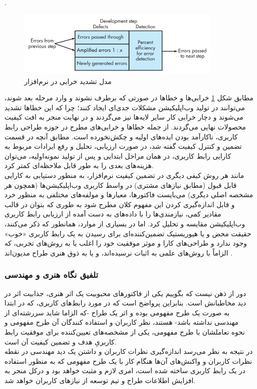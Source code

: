 \documentclass{article}
\theoremstyle{definition}
\begin{document}
\cite{sommerville}.
\begin{figure}[H]
	\centering\includegraphics[width=10cm]{Resources/defect.PNG}
	\caption{مدل تشدید خرابی در نرم‌افزار
		\cite{pressman}
	}
	\label{defect}
\end{figure}
مطابق شکل
\ref{defect}
خرابی‌ها و خطاها در صورتی که برطرف نشوند و وارد مرحله بعد شوند، می‌توانند در تولید وب‌اپلیکیشن مشکلات جدی‌ای ایجاد کنند؛ چرا که این خطاها تشدید می‌شوند و دچار خرابی کار سایر لایه‌ها نیز می‌گردند و در نهایت منجر به افت کیفیت محصولات نهایی می‌گردند. از جمله خطاها و خرابی‌های مطرح در حوزه طراحی رابط کاربری، ناکارآمد بودن ایده‌های اولیه و چکش‌نخورده است. مطابق آنچه در قسمت تضمین و کنترل کیفیت گفته شد، در صورت ارزیابی، تحلیل و رفع ایرادات مربوط به کارایی رابط کاربری، در همان مراحل ابتدایی و پس از تولید نمونه‌اولیه، می‌توان هزینه‌های بعدی را به طور قابل ملاحظه‌ای کمتر کرد.\\
مانند هر روش کیفی دیگری در تضمین کیفیت نرم‌افزار، به منظور دستیابی به کارایی قابل قبول (مطابق نیازهای مشتری) در واسط کاربری وب‌اپلیکیشن‌ها (همچون هر مشخصه اصلی دیگری) می‌بایست فاکتورها، معیارها و مولفه‌های مختلفی به منظور خرد و قابل اندازه‌گیری کردن این مفهوم کلان مطرح شود به طوری که بتوان در قالب مقادیر کمی، نیازمندی‌ها را با داده‌های به دست آمده از ارزیابی رابط کاربری وب‌اپلیکیشن مقایسه و تحلیل کرد. اما در بسیاری از موارد، همانطور که
\cite{assesing, main2}
ذکر می‌کنند، حقیقت محض و یا هیوریستیک تضمین‌کننده‌ای برای رسیدن به یک رابط کاربری «خوب» وجود ندارد و طراحی‌های کارا و موثر موفقیت خود را اغلب یا به روش‌های تجربی، که الزاماً با روش‌های علمی به اثبات نرسیده‌اند، و یا به ذوق هنری طراح مدیون‌اند
\cite{measuring}. \\
\subsubsection{تلفیق نگاه هنری و مهندسی}
دور از ذهن نیست که بگوییم یکی از فاکتورهای محبوبیت یک اثر هنری، جذابیت اثر در دید مخاطبانش است. بنابراین پرواضح است که در مورد رابط‌های کاربری، که در ابتدا به صورت یک طرح مفهومی بوده و اثر یک طراح -که الزاما شاید سررشته‌ای از مهندسی نداشته باشد- هستند، نظر کاربران و استفاده کنندگان آن طرح مفهومی و نحوه تعاملشان با طرح مفهومی، یکی از مشخصه‌های تعیین‌کننده برای موفقیت رابط کاربریِ هدف و تضمین کیفیت آن است.\\
در نتیجه به نظر می‌رسد اندازه‌گیری نظرات کاربران و داشتن یک دید مهندسی در نقطه نظرات کاربران و واکنش‌های آن‌ها هنگام کار با یک طرح مفهومی که به منظور استفاده در یک رابط کاربری ساخته شده است، امری لازم و مثبت خواهد بود و درکل منجر به افزایش اطلاعات طراح و تیم توسعه از نیازهای کاربران خواهد شد.
\end{document}
